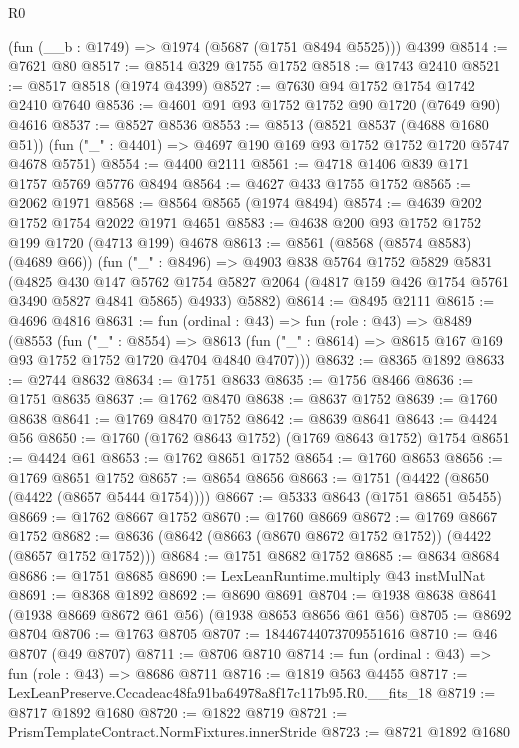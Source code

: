 \begin{lexlean}{R0}
\begin{coremodule}
    (fun (__b : @1749) => @1974 (@5687 (@1751 @8494 @5525)))
    @4399
@8514 := @7621 @80
@8517 := @8514 @329 @1755 @1752
@8518 := @1743 @2410
@8521 := @8517 @8518 (@1974 @4399)
@8527 := @7630 @94 @1752 @1754 @1742 @2410 @7640
@8536 := @4601 @91 @93 @1752 @1752 @90 @1720 (@7649 @90) @4616
@8537 := @8527 @8536
@8553 := @8513
    (@8521 @8537 (@4688 @1680 @51))
    (fun ("_" : @4401) => @4697 @190 @169 @93 @1752 @1752 @1720 @5747 @4678 @5751)
@8554 := @4400 @2111
@8561 := @4718 @1406 @839 @171 @1757 @5769 @5776 @8494
@8564 := @4627 @433 @1755 @1752
@8565 := @2062 @1971
@8568 := @8564 @8565 (@1974 @8494)
@8574 := @4639 @202 @1752 @1754 @2022 @1971 @4651
@8583 := @4638 @200 @93 @1752 @1752 @199 @1720 (@4713 @199) @4678
@8613 := @8561
    (@8568 (@8574 @8583) (@4689 @66))
    (fun ("_" : @8496) =>
    @4903
      @838
      @5764
      @1752
      @5829
      @5831
      (@4825
        @430
        @147
        @5762
        @1754
        @5827
        @2064
        (@4817 @159 @426 @1754 @5761 @3490 @5827 @4841 @5865)
        @4933)
      @5882)
@8614 := @8495 @2111
@8615 := @4696 @4816
@8631 := fun (ordinal : @43) =>
  fun (role : @43) =>
  @8489
    (@8553
      (fun ("_" : @8554) =>
      @8613 (fun ("_" : @8614) => @8615 @167 @169 @93 @1752 @1752 @1720 @4704 @4840 @4707)))
@8632 := @8365 @1892
@8633 := @2744 @8632
@8634 := @1751 @8633
@8635 := @1756 @8466
@8636 := @1751 @8635
@8637 := @1762 @8470
@8638 := @8637 @1752
@8639 := @1760 @8638
@8641 := @1769 @8470 @1752
@8642 := @8639 @8641
@8643 := @4424 @56
@8650 := @1760 (@1762 @8643 @1752) (@1769 @8643 @1752) @1754
@8651 := @4424 @61
@8653 := @1762 @8651 @1752
@8654 := @1760 @8653
@8656 := @1769 @8651 @1752
@8657 := @8654 @8656
@8663 := @1751 (@4422 (@8650 (@4422 (@8657 @5444 @1754))))
@8667 := @5333 @8643 (@1751 @8651 @5455)
@8669 := @1762 @8667 @1752
@8670 := @1760 @8669
@8672 := @1769 @8667 @1752
@8682 := @8636 (@8642 (@8663 (@8670 @8672 @1752 @1752)) (@4422 (@8657 @1752 @1752)))
@8684 := @1751 @8682 @1752
@8685 := @8634 @8684
@8686 := @1751 @8685
@8690 := LexLeanRuntime.multiply @43 instMulNat
@8691 := @8368 @1892
@8692 := @8690 @8691
@8704 := @1938 @8638 @8641 (@1938 @8669 @8672 @61 @56) (@1938 @8653 @8656 @61 @56)
@8705 := @8692 @8704
@8706 := @1763 @8705
@8707 := 18446744073709551616
@8710 := @46 @8707 (@49 @8707)
@8711 := @8706 @8710
@8714 := fun (ordinal : @43) => fun (role : @43) => @8686 @8711
@8716 := @1819 @563 @4455
@8717 := LexLeanPreserve.Cccadeac48fa91ba64978a8f17c117b95.R0.__fits_18
@8719 := @8717 @1892 @1680
@8720 := @1822 @8719
@8721 := PrismTemplateContract.NormFixtures.innerStride
@8723 := @8721 @1892 @1680

\end{coremodule}
\end{lexlean}
